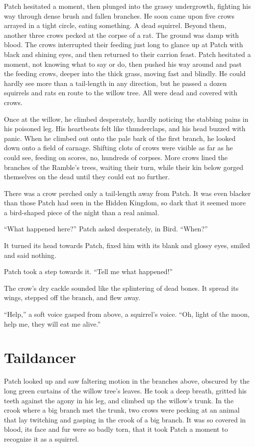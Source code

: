 \documentclass[12pt]{memoir}
\begin{document}
Patch hesitated a moment, then plunged into the grassy undergrowth,
fighting his way through dense brush and fallen branches. He soon came
upon five crows arrayed in a tight circle, eating something. A dead
squirrel. Beyond them, another three crows pecked at the corpse of a
rat. The ground was damp with blood. The crows interrupted their
feeding just long to glance up at Patch with black and shining eyes,
and then returned to their carrion feast. Patch hesitated a moment,
not knowing what to say or do, then pushed his way around and past the
feeding crows, deeper into the thick grass, moving fast and
blindly. He could hardly see more than a tail-length in any direction,
but he passed a dozen squirrels and rats en route to the willow
tree. All were dead and covered with crows.

Once at the willow, he climbed desperately, hardly noticing the
stabbing pains in his poisoned leg. His heartbeats felt like
thunderclaps, and his head buzzed with panic. When he climbed out onto
the pale bark of the first branch, he looked down onto a field of
carnage. Shifting clots of crows were visible as far as he could see,
feeding on scores, no, hundreds of corpses. More crows lined the
branches of the Ramble’s trees, waiting their turn, while their kin
below gorged themselves on the dead until they could eat no further.

There was a crow perched only a tail-length away from Patch. It was
even blacker than those Patch had seen in the Hidden Kingdom, so dark
that it seemed more a bird-shaped piece of the night than a real
animal.

“What happened here?” Patch asked desperately, in Bird. “When?”

It turned its head towards Patch, fixed him with its blank and glossy
eyes, smiled and said nothing.

Patch took a step towards it. “Tell me what happened!”

The crow’s dry cackle sounded like the splintering of dead bones. It
spread its wings, stepped off the branch, and flew away.

“Help,” a soft voice gasped from above, a squirrel’s voice. “Oh, light
of the moon, help me, they will eat me alive.”


\section{Taildancer}

Patch looked up and saw faltering motion in the branches above,
obscured by the long green curtains of the willow tree’s leaves. He
took a deep breath, gritted his teeth against the agony in his leg,
and climbed up the willow’s trunk. In the crook where a big branch met
the trunk, two crows were pecking at an animal that lay twitching and
gasping in the crook of a big branch. It was so covered in blood, its
face and fur were so badly torn, that it took Patch a moment to
recognize it as a squirrel.
\end{document}
